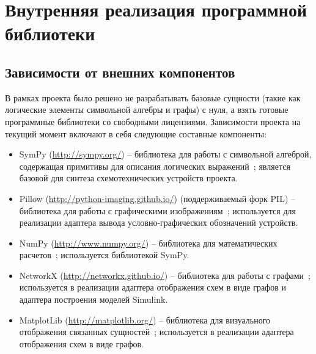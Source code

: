 \documentclass[document.tex]{subfiles}
\begin{document}
\clearpage
\section{Внутренняя реализация программной библиотеки}

\subsection{Зависимости от внешних компонентов}
В рамках проекта было решено не разрабатывать базовые сущности (такие
как логические элементы символьной алгебры и графы) с нуля, а взять готовые
программные библиотеки со свободными лицензиями. Зависимости проекта на текущий
момент включают в себя следующие составные компоненты:
\begin{itemize}[noitemsep]
  \item SymPy ({\url{http://sympy.org/}}) -- библиотека для работы с
  символьной алгеброй, содержащая примитивы для описания логических
  выражений~\cite{sympydoc}; является базовой для синтеза схемотехнических
  устройств проекта.
  \item Pillow ({\url{http://python-imaging.github.io/}}) (поддерживаемый форк
  PIL) -- библиотека для работы с графическими изображениям~\cite{pillowdoc};
  используется для реализации адаптера вывода условно-графических обозначений устройств.
  \item NumPy ({\url{http://www.numpy.org/}}) -- библиотека для математических
  расчетов~\cite{numpydoc}; используется библиотекой SymPy.
  \item NetworkX ({\url{http://networkx.github.io/}}) -- библиотека для работы с
  графами~\cite{networkx}; используется в реализации адаптера отображения схем в
  виде графов и адаптера построения моделей Simulink.
  \item MatplotLib ({\url{http://matplotlib.org/}}) -- библиотека для
  визуального отображения связанных сущностей~\cite{matplotlib}; используется в
  реализации адаптера отображения схем в виде графов.
\end{itemize}
\end{document}
